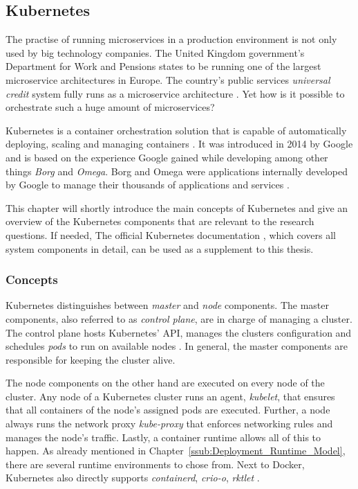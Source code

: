 
\subsection{Kubernetes}%
\label{sub:Kubernetes}

The practise of running microservices in a production environment is not only
used by big technology companies. The United Kingdom government's Department
for Work and Pensions states to be running one of the largest microservice
architectures in Europe. The country's public services \textit{universal
credit} system fully runs as a microservice architecture
\autocite{LoweLeadingwaymicroservices2016}. Yet how is it possible to
orchestrate such a huge amount of microservices?

Kubernetes is a container orchestration solution that is capable of
automatically deploying, scaling and managing containers
\autocite{AuthorsProductionGradeContainer}. It was introduced in 2014 by Google
and is based on the experience Google gained while developing among other
things \textit{Borg} and \textit{Omega}. Borg and Omega were applications
internally developed by Google to manage their thousands of applications and
services \autocite{LuksaKubernetesAction2017}.

This chapter will shortly introduce the main concepts of Kubernetes and give an
overview of the Kubernetes components that are relevant to the research
questions. If needed, The official Kubernetes documentation
\autocite{AuthorsProductionGradeContainer}, which covers all system components
in detail, can be used as a supplement to this thesis.

\subsubsection{Concepts}%
\label{ssub:Concepts}
Kubernetes distinguishes between \textit{master} and \textit{node} components.
The master components, also referred to as \textit{control plane}, are in
charge of managing a cluster. The control plane hosts Kubernetes' API, manages
the clusters configuration and schedules \textit{pods} to run on available
nodes \autocite{AuthorsKubernetesComponents2019}. In general, the master
components are responsible for keeping the cluster alive.

The node components on the other hand are executed on every node of the
cluster. Any node of a Kubernetes cluster runs an agent, \textit{kubelet}, that
ensures that all containers of the node's assigned pods are executed. Further,
a node always runs the network proxy \textit{kube-proxy} that enforces
networking rules and manages the node's traffic. Lastly, a container runtime
allows all of this to happen. As already mentioned in
Chapter~\ref{ssub:Deployment_Runtime_Model}, there are several runtime
environments to chose from. Next to Docker, Kubernetes also directly supports
\textit{containerd}, \textit{crio-o}, \textit{rktlet}
\autocite{AuthorsKubernetesComponents2019}.

